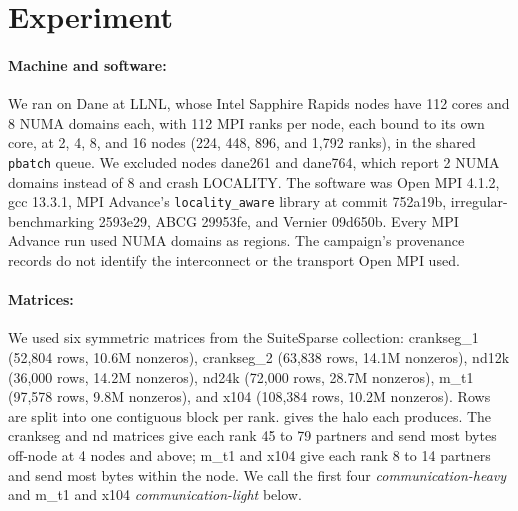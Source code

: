 \documentclass[11pt]{article}
\begin{document}
\section{Experiment}
\label{sec:setup}

\paragraph{Machine and software:} We ran on Dane at LLNL, whose Intel Sapphire Rapids
nodes have 112 cores and 8 NUMA domains each, with 112 MPI ranks per node, each bound to
its own core, at 2, 4, 8, and 16 nodes (224, 448, 896, and 1,792 ranks), in the
shared \texttt{pbatch} queue. We excluded nodes dane261 and dane764, which report 2 NUMA
domains instead of 8 and crash LOCALITY. The software was Open MPI 4.1.2, gcc 13.3.1, MPI
Advance's \texttt{locality\_aware} library at commit 752a19b, irregular-benchmarking 2593e29, ABCG
29953fe, and Vernier 09d650b. Every MPI Advance run used NUMA domains as regions. The campaign's provenance records do
not identify the interconnect or the transport Open MPI used.

\paragraph{Matrices:} We used six symmetric matrices from the SuiteSparse collection:
crankseg\_1 (52,804 rows, 10.6M nonzeros), crankseg\_2 (63,838 rows, 14.1M nonzeros),
nd12k (36,000 rows, 14.2M nonzeros), nd24k (72,000 rows, 28.7M nonzeros), m\_t1 (97,578
rows, 9.8M nonzeros), and x104 (108,384 rows, 10.2M nonzeros). Rows are split into one
contiguous block per rank.  gives the halo each produces. The crankseg
and nd matrices give each rank 45 to 79 partners and send most bytes off-node at 4 nodes
and above; m\_t1 and x104 give each rank 8 to 14 partners and send most bytes within the
node. We call the first four \emph{communication-heavy} and m\_t1 and x104
\emph{communication-light} below.
\end{document}
